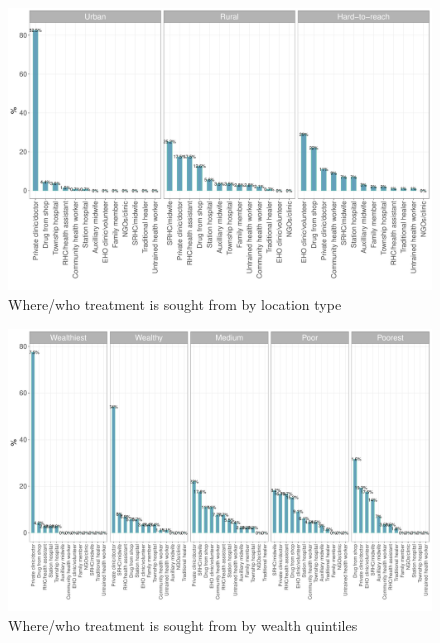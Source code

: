 \documentclass[12pt,a4paper]{article}
\begin{document}
\begin{figure}[H]

{\centering \includegraphics{kayinReport_files/figure-latex/fever5plot-1} 

}

\caption{Where/who treatment is sought from by location type}\label{fig:fever5plot}
\end{figure}

\begin{figure}[H]

{\centering \includegraphics{kayinReport_files/figure-latex/fever6plot-1} 

}

\caption{Where/who treatment is sought from by wealth quintiles}\label{fig:fever6plot}
\end{figure}
\end{document}
